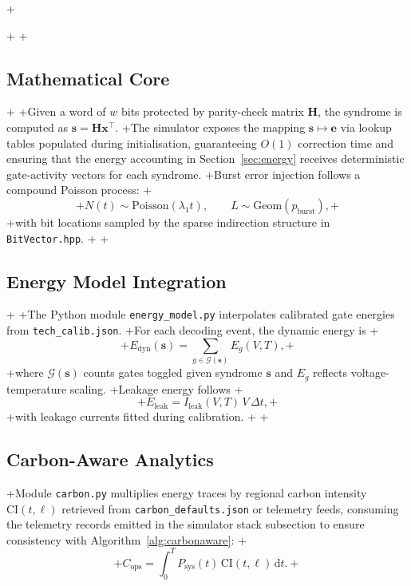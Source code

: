 +\documentclass[conference]{IEEEtran}
\begin{document}
+
+\subsection{Mathematical Core}
+\label{sec:mathcore}
+Given a word of $w$ bits protected by parity-check matrix $\mathbf{H}$, the syndrome is computed as $\mathbf{s}=\mathbf{H}\mathbf{x}^{\top}$.
+The simulator exposes the mapping $\mathbf{s}\mapsto \mathbf{e}$ via lookup tables populated during initialisation, guaranteeing $O(1)$ correction time and ensuring that the energy accounting in Section~\ref{sec:energy} receives deterministic gate-activity vectors for each syndrome.
+Burst error injection follows a compound Poisson process:
+\begin{equation}
+N(t) \sim \text{Poisson}(\lambda_{1} t),\qquad L \sim \text{Geom}(p_{\text{burst}}),
+\end{equation}
+with bit locations sampled by the sparse indirection structure in \texttt{BitVector.hpp}.
+
+\subsection{Energy Model Integration}
+\label{sec:energy}
+The Python module \texttt{energy\_model.py} interpolates calibrated gate energies from \texttt{tech\_calib.json}.
+For each decoding event, the dynamic energy is
+\begin{equation}
+E_{\text{dyn}}(\mathbf{s}) = \sum_{g \in \mathcal{G}(\mathbf{s})} E_{g}(V, T),
+\end{equation}
+where $\mathcal{G}(\mathbf{s})$ counts gates toggled given syndrome $\mathbf{s}$ and $E_{g}$ reflects voltage-temperature scaling.
+Leakage energy follows
+\begin{equation}
+E_{\text{leak}} = I_{\text{leak}}(V,T)\,V\,\Delta t,
+\end{equation}
+with leakage currents fitted during calibration.
+
+\subsection{Carbon-Aware Analytics}
+Module \texttt{carbon.py} multiplies energy traces by regional carbon intensity $\text{CI}(t,\ell)$ retrieved from \texttt{carbon\_defaults.json} or telemetry feeds, consuming the telemetry records emitted in the simulator stack subsection to ensure consistency with Algorithm~\ref{alg:carbonaware}:
+\begin{equation}
+C_{\text{ops}} = \int_{0}^{T} P_{\text{sys}}(t)\,\text{CI}(t,\ell)\,\mathrm{d}t.
+\end{equation}
\end{document}
